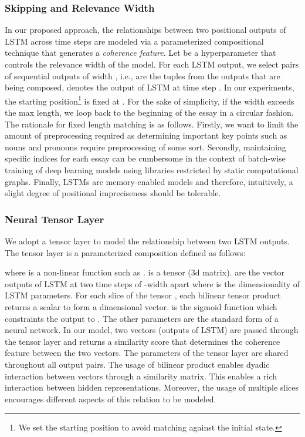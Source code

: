 \documentclass[letterpaper]{article}
\begin{document}
\subsubsection{Skipping and Relevance Width}
In our proposed approach, the relationships between two positional outputs of LSTM across time steps are modeled via a parameterized compositional technique that generates a \textit{coherence feature}. Let  be a hyperparameter that controls the relevance width of the model. For each LSTM output, we select pairs of sequential outputs of width , i.e.,  are the tuples from the outputs that are being composed,  denotes the output of LSTM at time step . In our experiments, the starting position\footnote{We set the starting position  to avoid matching against the initial state.} is fixed at . For the sake of simplicity, if the width  exceeds the max length, we loop back to the beginning of the essay in a circular fashion. The rationale for fixed length matching is as follows. Firstly, we want to limit the amount of preprocessing required as determining important key points such as nouns and pronouns require preprocessing of some sort. Secondly, maintaining specific indices for each essay can be cumbersome in the context of batch-wise training of deep learning models using libraries restricted by static computational graphs. Finally, LSTMs are memory-enabled models and therefore, intuitively, a slight degree of positional impreciseness should be tolerable. 

\subsubsection{Neural Tensor Layer}
We adopt a tensor layer to model the relationship between two LSTM outputs. The tensor layer is a parameterized composition defined as follows:
 
where  is a non-linear function such as .  is a tensor (3d matrix).  are the vector outputs of LSTM at two time steps of -width apart where  is the dimensionality of LSTM parameters. For each slice of the tensor , each bilinear tensor product  returns a scalar to form a  dimensional vector.  is the sigmoid function which constraints the output to . The other parameters are the standard form of a neural network. In our model, two vectors (outputs of LSTM) are passed through the tensor layer and returns a similarity score  that determines the coherence feature between the two vectors. The parameters of the tensor layer are shared throughout all output pairs. The usage of bilinear product enables dyadic interaction between vectors through a similarity matrix. This enables a rich interaction between hidden representations. Moreover, the usage of multiple slices encourages different aspects of this relation to be modeled. 
\end{document}
